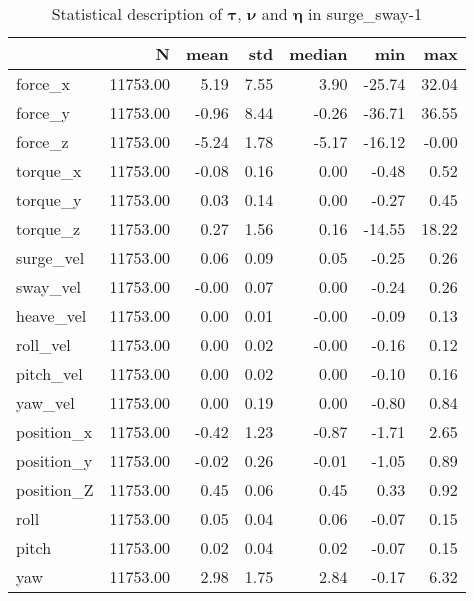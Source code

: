 \begin{table}[hb]
\centering
\caption{Statistical description of $\boldsymbol{\tau}$, $\boldsymbol{\nu}$ and $\boldsymbol{\eta}$ in surge_sway-1}
\label{tab:description-surge_sway-1}
\begin{tabular}{lrrrrrr}
\toprule
{} &        N &  mean &  std & median &    min &   max \\
\midrule
force\_x    & 11753.00 &  5.19 & 7.55 &   3.90 & -25.74 & 32.04 \\
force\_y    & 11753.00 & -0.96 & 8.44 &  -0.26 & -36.71 & 36.55 \\
force\_z    & 11753.00 & -5.24 & 1.78 &  -5.17 & -16.12 & -0.00 \\
torque\_x   & 11753.00 & -0.08 & 0.16 &   0.00 &  -0.48 &  0.52 \\
torque\_y   & 11753.00 &  0.03 & 0.14 &   0.00 &  -0.27 &  0.45 \\
torque\_z   & 11753.00 &  0.27 & 1.56 &   0.16 & -14.55 & 18.22 \\
surge\_vel  & 11753.00 &  0.06 & 0.09 &   0.05 &  -0.25 &  0.26 \\
sway\_vel   & 11753.00 & -0.00 & 0.07 &   0.00 &  -0.24 &  0.26 \\
heave\_vel  & 11753.00 &  0.00 & 0.01 &  -0.00 &  -0.09 &  0.13 \\
roll\_vel   & 11753.00 &  0.00 & 0.02 &  -0.00 &  -0.16 &  0.12 \\
pitch\_vel  & 11753.00 &  0.00 & 0.02 &   0.00 &  -0.10 &  0.16 \\
yaw\_vel    & 11753.00 &  0.00 & 0.19 &   0.00 &  -0.80 &  0.84 \\
position\_x & 11753.00 & -0.42 & 1.23 &  -0.87 &  -1.71 &  2.65 \\
position\_y & 11753.00 & -0.02 & 0.26 &  -0.01 &  -1.05 &  0.89 \\
position\_Z & 11753.00 &  0.45 & 0.06 &   0.45 &   0.33 &  0.92 \\
roll       & 11753.00 &  0.05 & 0.04 &   0.06 &  -0.07 &  0.15 \\
pitch      & 11753.00 &  0.02 & 0.04 &   0.02 &  -0.07 &  0.15 \\
yaw        & 11753.00 &  2.98 & 1.75 &   2.84 &  -0.17 &  6.32 \\
\bottomrule
\end{tabular}
\end{table}
